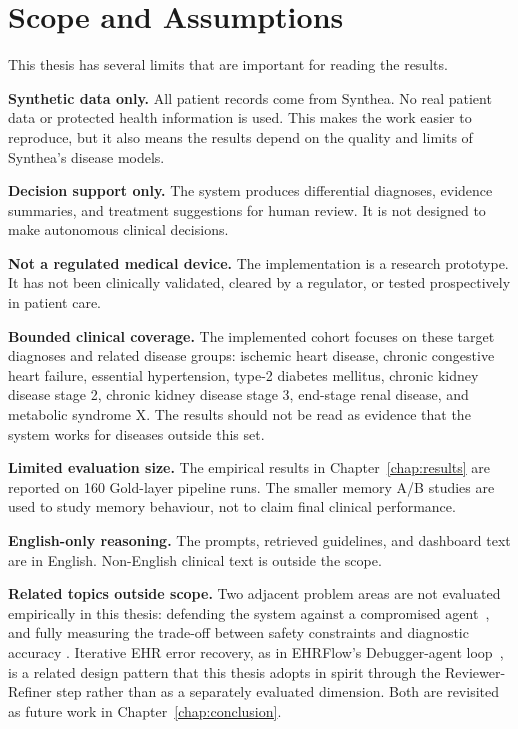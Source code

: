 \section{Scope and Assumptions}
\label{sec:scope}

This thesis has several limits that are important for reading the results.

\textbf{Synthetic data only.} All patient records come from Synthea. No real
patient data or protected health information is used. This makes the work easier
to reproduce, but it also means the results depend on the quality and limits of
Synthea's disease models.

\textbf{Decision support only.} The system produces differential diagnoses,
evidence summaries, and treatment suggestions for human review. It is not
designed to make autonomous clinical decisions.

\textbf{Not a regulated medical device.} The implementation is a research
prototype. It has not been clinically validated, cleared by a regulator, or
tested prospectively in patient care.

\textbf{Bounded clinical coverage.} The implemented cohort focuses on these
target diagnoses and related disease groups: ischemic heart disease, chronic
congestive heart failure, essential hypertension, type-2 diabetes mellitus,
chronic kidney disease stage 2, chronic kidney disease stage 3, end-stage renal
disease, and metabolic syndrome X. The results should not be read as evidence
that the system works for diseases outside this set.

\textbf{Limited evaluation size.} The empirical results in
Chapter~\ref{chap:results} are reported on 160 Gold-layer pipeline runs.
The smaller memory A/B studies are used to study memory behaviour, not to
claim final clinical performance.

\textbf{English-only reasoning.} The prompts, retrieved guidelines, and
dashboard text are in English. Non-English clinical text is outside the scope.

\textbf{Related topics outside scope.} Two adjacent problem areas are
not evaluated empirically in this thesis: defending the system against
a compromised agent~\cite{Chen2025MedSentry}, and fully measuring the
trade-off between safety constraints and diagnostic accuracy
\cite{Kim2025TAO,Chen2025MedSentry}. Iterative EHR error recovery, as
in EHRFlow's Debugger-agent loop~\cite{Wu2024EHRFlow}, is a related
design pattern that this thesis adopts in spirit through the
Reviewer-Refiner step rather than as a separately evaluated dimension.
Both are revisited as future work in Chapter~\ref{chap:conclusion}.

